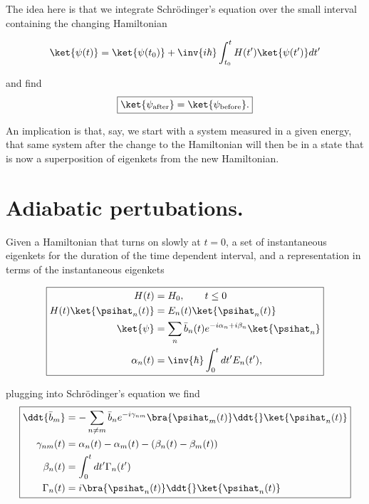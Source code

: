 The idea here is that we integrate Schr\"{o}dinger's equation over the small interval containing the changing Hamiltonian

\begin{equation}\label{eqn:qmTwoReview:n}
\ket{\psi(t)} = \ket{\psi(t_0)} + \inv{i\hbar} \int_{t_0}^t H(t') \ket{\psi(t')} dt'
\end{equation}

and find
\begin{equation}\label{eqn:qmTwoReview:n}
\boxed{
\ket{\psi_\text{after}} = \ket{\psi_\text{before}}.
}
\end{equation}

An implication is that, say, we start with a system measured in a given energy, that same system after the change to the Hamiltonian will then be in a state that is now a superposition of eigenkets from the new Hamiltonian.

\section{Adiabatic pertubations.}

Given a Hamiltonian that turns on slowly at $t=0$, a set of instantaneous eigenkets for the duration of the time dependent interval, and a representation in terms of the instantaneous eigenkets

\begin{equation}\label{eqn:qmTwoReview:n}
\boxed{
\begin{aligned}
H(t) &= H_0, \qquad t \le 0 \\
H(t) \ket{\psihat_n(t)} &= E_n(t) \ket{\psihat_n(t)} \\
\ket{\psi} &= \sum_n \bar{b}_n(t) e^{-i\alpha_n + i \beta_n} \ket{\psihat_n} \\
\alpha_n(t) &= \inv{\hbar} \int_0^t dt' E_n(t'),
\end{aligned}
}
\end{equation}

plugging into Schr\"{o}dinger's equation we find
\begin{equation}\label{eqn:qmTwoReview:n}
\boxed{
\begin{aligned}
\ddt{\bar{b}_m} &= - \sum_{n \ne m} \bar{b}_n e^{-i \gamma_{nm} } \bra{\psihat_m(t)} \ddt{} \ket{\psihat_n(t)}  \\
\gamma_{nm}(t) &= \alpha_n(t) - \alpha_m(t) - (\beta_n(t) - \beta_m(t)) \\
\beta_n(t) &= \int_0^t dt' \Gamma_n(t') \\
\Gamma_n(t) &= i \bra{\psihat_n(t)} \ddt{} \ket{\psihat_n(t)} \\
\end{aligned}
}
\end{equation}

